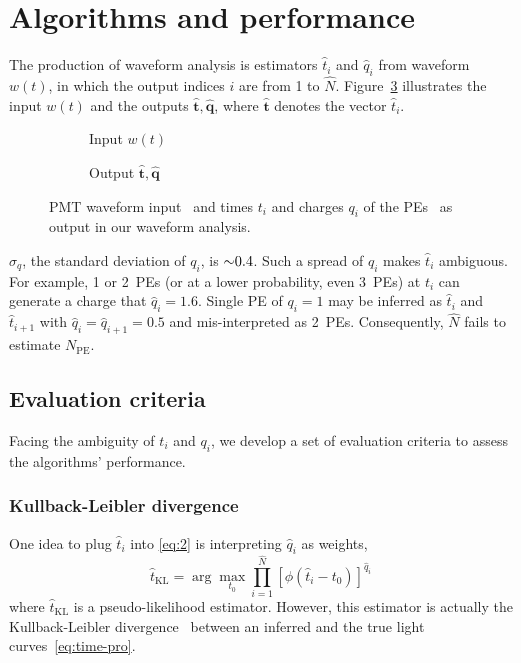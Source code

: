 \section{Algorithms and performance}
\label{sec:algorithm}

The production of waveform analysis is estimators $\hat{t}_i$ and $\hat{q}_i$ from waveform $w(t)$, in which the output indices $i$ are from 1 to $\hat{N}$. Figure~\ref{fig:io} illustrates the input $w(t)$ and the outputs $\bm{\hat{t}}, \bm{\hat{q}}$, where $\bm{\hat{t}}$ denotes the vector $\hat{t}_i$. 
\begin{figure}[H]
  \centering
  \begin{subfigure}{.45\textwidth}
    \resizebox{\textwidth}{!}{}
    \caption{\label{fig:input} Input $w(t)$}
  \end{subfigure}
  \begin{subfigure}{.45\textwidth}
    \resizebox{\textwidth}{!}{}
    \caption{\label{fig:output} Output $\bm{\hat{t}}, \bm{\hat{q}}$}
  \end{subfigure}
  \caption{\label{fig:io} PMT waveform input~ and times $t_i$ and charges $q_i$ of the PEs~ as output in our waveform analysis. }
\end{figure}

$\sigma_q$, the standard deviation of $q_i$, is $\num{\sim 0.4}$. Such a spread of $q_i$ makes $\hat{t}_i$ ambiguous. For example, 1 or 2~PEs (or at a lower probability, even 3~PEs) at $t_i$ can generate a charge that $\hat{q}_i=1.6$. Single PE of $q_i=1$ may be inferred as $\hat{t}_i$ and $\hat{t}_{i+1}$ with $\hat{q}_i=\hat{q}_{i+1}=0.5$ and mis-interpreted as 2~PEs. Consequently, $\hat{N}$ fails to estimate $N_\mathrm{PE}$. 

\subsection{Evaluation criteria}
\label{sec:criteria}
Facing the ambiguity of $t_i$ and $q_i$, we develop a set of evaluation criteria to assess the algorithms' performance. 

\subsubsection{Kullback-Leibler divergence}
\label{sec:pseudo}

One idea to plug $\hat{t}_i$ into \eqref{eq:2} is interpreting $\hat{q}_i$ as weights,
\begin{equation}
  \label{eq:pseudo}
  \hat{t}_\mathrm{KL} = \arg\underset{t_0}{\max} \prod_{i=1}^{\hat{N}} \left[\phi(\hat{t}_i-t_0)\right]^{\hat{q}_i}
\end{equation}
where $\hat{t}_\mathrm{KL}$ is a pseudo-likelihood estimator. However, this estimator is actually the Kullback-Leibler divergence~\cite{kullback_information_1951} between an inferred and the true light curves~\eqref{eq:time-pro}. 


